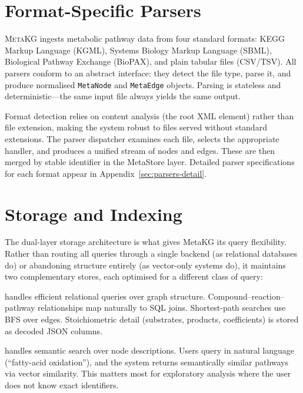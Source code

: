\documentclass[10pt]{article}
\begin{document}
\section{Format-Specific Parsers}
\label{sec:parsers}

\textsc{MetaKG} ingests metabolic pathway data from four standard formats:
KEGG Markup Language (KGML), Systems Biology Markup Language (SBML), Biological
Pathway Exchange (BioPAX), and plain tabular files (CSV/TSV). All parsers
conform to an abstract interface: they detect the file type, parse it, and
produce normalised \texttt{MetaNode} and \texttt{MetaEdge} objects. Parsing is
stateless and deterministic---the same input file always yields the same
output.

Format detection relies on content analysis (the root XML element) rather than
file extension, making the system robust to files served without standard
extensions. The parser dispatcher examines each file, selects the appropriate
handler, and produces a unified stream of nodes and edges. These are then
merged by stable identifier in the MetaStore layer. Detailed parser
specifications for each format appear in Appendix~\ref{sec:parsers-detail}.

\section{Storage and Indexing}
\label{sec:storage}

The dual-layer storage architecture is what gives MetaKG its query
flexibility. Rather than routing all queries through a single backend (as
relational databases do) or abandoning structure entirely (as vector-only
systems do), it maintains two complementary stores, each optimised for a
different class of query:

\begin{description}[leftmargin=*,itemsep=3pt]
\item[SQLite] handles efficient relational queries over graph structure.
  Compound--reaction--pathway relationships map naturally to SQL joins.
  Shortest-path searches use BFS over edges. Stoichiometric detail
  (substrates, products, coefficients) is stored as decoded JSON columns.

\item[LanceDB + embeddings] handles semantic search over node descriptions.
  Users query in natural language (``fatty-acid oxidation''), and the system
  returns semantically similar pathways via vector similarity. This matters
  most for exploratory analysis where the user does not know exact identifiers.
\end{description}
\end{document}
